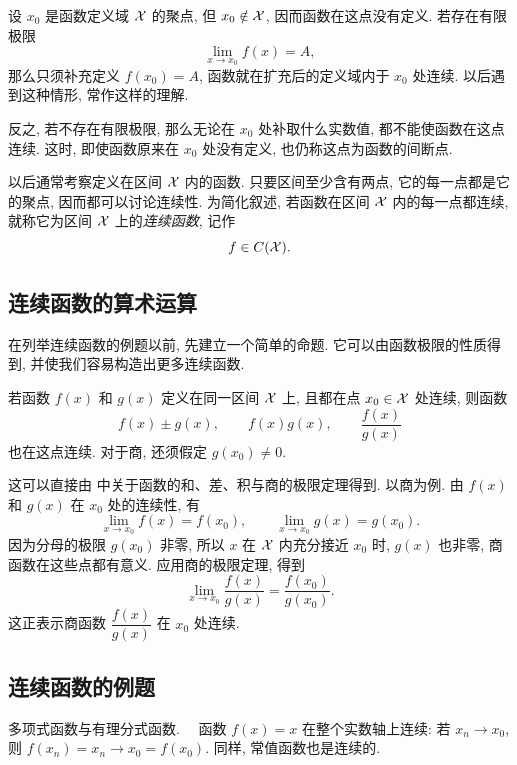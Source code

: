 \begin{remark}\label{rem:continuous_extension_at_missing_point}
设 $x_0$ 是函数定义域 $\mathcal{X}$ 的聚点, 但 $x_0\notin\mathcal{X}$, 因而函数在这点没有定义.
若存在有限极限
$$
\lim_{x\to x_0}f(x)=A,
$$
那么只须补充定义 $f(x_0)=A$, 函数就在扩充后的定义域内于 $x_0$ 处连续.
以后遇到这种情形, 常作这样的理解.

反之, 若不存在有限极限, 那么无论在 $x_0$ 处补取什么实数值,
都不能使函数在这点连续.
这时, 即使函数原来在 $x_0$ 处没有定义, 也仍称这点为函数的间断点.

以后通常考察定义在区间 $\mathcal{X}$ 内的函数.
只要区间至少含有两点, 它的每一点都是它的聚点, 因而都可以讨论连续性.
为简化叙述, 若函数在区间 $\mathcal{X}$ 内的每一点都连续,
就称它为区间 $\mathcal{X}$ 上的\emph{连续函数}, 记作
$$
f\in C(\mathcal{X}).
$$
\end{remark}

\subsection{连续函数的算术运算}\label{subsec:67}
在列举连续函数的例题以前, 先建立一个简单的命题.
它可以由函数极限的性质得到, 并使我们容易构造出更多连续函数.

\begin{theorem}\label{thm:continuity_arithmetic}
若函数 $f(x)$ 和 $g(x)$ 定义在同一区间 $\mathcal{X}$ 上, 且都在点 $x_0\in\mathcal{X}$ 处连续,
则函数
$$
f(x)\pm g(x),\qquad f(x)g(x),\qquad \frac{f(x)}{g(x)}
$$
也在这点连续. 对于商, 还须假定 $g(x_0)\neq0$.
\end{theorem}

这可以直接由  中关于函数的和、差、积与商的极限定理得到.
以商为例. 由 $f(x)$ 和 $g(x)$ 在 $x_0$ 处的连续性, 有
$$
\lim_{x\to x_0}f(x)=f(x_0),\qquad
\lim_{x\to x_0}g(x)=g(x_0).
$$
因为分母的极限 $g(x_0)$ 非零, 所以 $x$ 在 $\mathcal{X}$ 内充分接近 $x_0$ 时,
$g(x)$ 也非零, 商函数在这些点都有意义.
应用商的极限定理, 得到
$$
\lim_{x\to x_0}\frac{f(x)}{g(x)}=\frac{f(x_0)}{g(x_0)}.
$$
这正表示商函数 $\dfrac{f(x)}{g(x)}$ 在 $x_0$ 处连续.

\subsection{连续函数的例题}\label{subsec:68}
\myrefparagraph{1\textdegree}\label{ex:polynomial_rational_continuity}
多项式函数与有理分式函数.~~
函数 $f(x)=x$ 在整个实数轴上连续: 若 $x_n\to x_0$, 则
$
f(x_n)=x_n\to x_0=f(x_0).
$
同样, 常值函数也是连续的.


